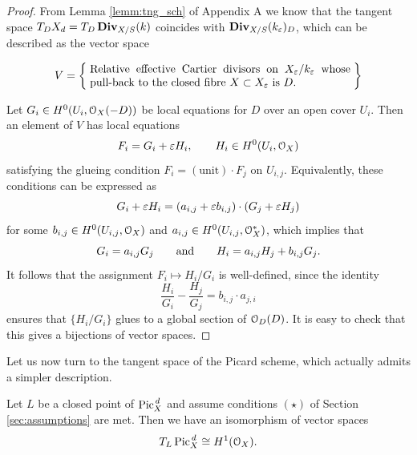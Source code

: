 	\begin{proof}
		From Lemma \ref{lemm:tng_sch} of Appendix A we know that the tangent space $T_D X_d = T_D\operatorname{\mathbf{Div}}_{X/S}(k)$ coincides with $ \operatorname{\mathbf{Div}}_{X/S}(k_\varepsilon)_D$, which can be described as the vector space
		
		$$ 
		V = \set{\parbox{8.2cm}{
		Relative effective Cartier divisors on $X_\eps / k_\eps$ 
		whose pull-back to the closed fibre $X\subset X_\eps$ is $D$.
		}}
		\vspace{0.5em}
		$$

		Let $G_i \in H^0(U_i,\mathcal{O}_X(-D)) $ be local equations for $D$ over an open cover $U_i$. Then an element of $V$ has local equations
		$$ F_i = G_i + \varepsilon H_i, \qquad H_i \in H^0(U_i,\mathcal{O}_X) $$
		satisfying the glueing condition $F_i = (\text{unit})\cdot F_j$ on $U_{i,j}$. Equivalently, these conditions can be expressed as
		$$ G_i + \varepsilon H_i = (a_{i,j} + \varepsilon b_{i,j})\cdot (G_j + \varepsilon H_j) $$
		for some $b_{i,j} \in H^0(U_{i,j},\mathcal{O}_X)$ and $ a_{i,j} \in H^0(U_{i,j},\mathcal{O}_X^*)$, which implies that
		$$ G_i = a_{i,j} G_j \qquad \text{and} \qquad H_i = a_{i,j} H_j + b_{i,j}G_j. $$
		It follows that the assignment $F_i \mapsto H_i/G_i$ is well-defined, since the identity
		$$ \frac{H_i}{G_i}-\frac{H_j}{G_j} = b_{i,j}\cdot a_{j,i} $$
		ensures that $\{H_i/G_i \} $ glues to a global section of $\mathcal{O}_D(D)$. It is easy to check that this gives a bijections of vector spaces.
	\end{proof}
	Let us now turn to the tangent space of the Picard scheme, which actually admits a simpler description.
	\begin{prop}\label{prop:tgn_pic}
		Let $L$ be a closed point of $ \operatorname{Pic}^{\,d}_X$ and assume conditions $(\star)$ of Section \ref{sec:assumptions} are met. Then we have an isomorphism of vector spaces
		$$ T_L \operatorname{Pic}^{\,d}_X \cong H^1(\mathcal{O}_X). $$
	\end{prop}
